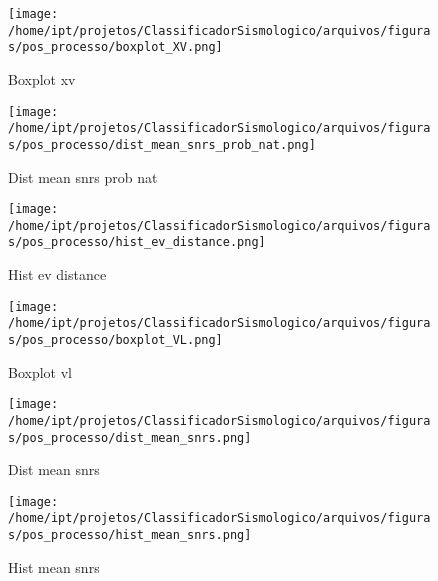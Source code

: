                     \begin{figure}[H]
                        \centering
                        \texttt{[image: /home/ipt/projetos/ClassificadorSismologico/arquivos/figuras/pos\_processo/boxplot\_XV.png]}
                        \caption{Boxplot xv}
                        \label{fig:boxplot_XV}
                    \end{figure}
                

                    \begin{figure}[H]
                        \centering
                        \texttt{[image: /home/ipt/projetos/ClassificadorSismologico/arquivos/figuras/pos\_processo/dist\_mean\_snrs\_prob\_nat.png]}
                        \caption{Dist mean snrs prob nat}
                        \label{fig:dist_mean_snrs_prob_nat}
                    \end{figure}
                

                    \begin{figure}[H]
                        \centering
                        \texttt{[image: /home/ipt/projetos/ClassificadorSismologico/arquivos/figuras/pos\_processo/hist\_ev\_distance.png]}
                        \caption{Hist ev distance}
                        \label{fig:hist_ev_distance}
                    \end{figure}
                

                    \begin{figure}[H]
                        \centering
                        \texttt{[image: /home/ipt/projetos/ClassificadorSismologico/arquivos/figuras/pos\_processo/boxplot\_VL.png]}
                        \caption{Boxplot vl}
                        \label{fig:boxplot_VL}
                    \end{figure}
                

                    \begin{figure}[H]
                        \centering
                        \texttt{[image: /home/ipt/projetos/ClassificadorSismologico/arquivos/figuras/pos\_processo/dist\_mean\_snrs.png]}
                        \caption{Dist mean snrs}
                        \label{fig:dist_mean_snrs}
                    \end{figure}
                

                    \begin{figure}[H]
                        \centering
                        \texttt{[image: /home/ipt/projetos/ClassificadorSismologico/arquivos/figuras/pos\_processo/hist\_mean\_snrs.png]}
                        \caption{Hist mean snrs}
                        \label{fig:hist_mean_snrs}
                    \end{figure}
                

